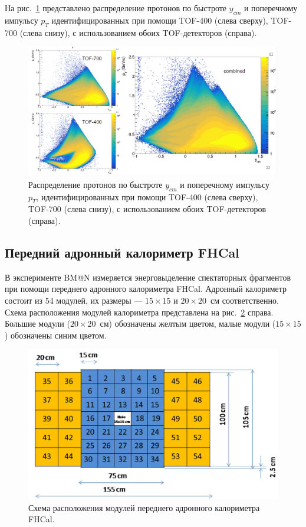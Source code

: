 На рис.~\ref{fig:bmn_pt_y} представлено распределение протонов по быстроте $y_{cm}$ и поперечному импульсу $p_T$ идентифицированных при помощи TOF-400 (слева сверху), TOF-700 (слева снизу), с использованием обоих TOF-детекторов (справа).
%
\begin{figure}[ht]
\begin{center}
\includegraphics[width=0.95\linewidth]{images/bmn_pt_y_acceptance.png}
\caption{Распределение протонов по быстроте $y_{cm}$ и поперечному импульсу $p_T$, идентифицированных при помощи TOF-400 (слева сверху), TOF-700 (слева снизу), с использованием обоих TOF-детекторов (справа).}
\label{fig:bmn_pt_y}
\end{center}
\end{figure}

\subsection{Передний адронный калориметр FHCal}

В эксперименте BM@N измеряется энерговыделение спектаторных фрагментов при помощи переднего адронного калориметра FHCal.
Адронный калориметр состоит из 54 модулей, их размеры --- $15\times15$ и $20\times20$~см соответственно.
Схема расположения модулей калориметра представлена на рис.~\ref{fig:fhcal_layout} справа.
Большие модули ($20\times20$~см) обозначены желтым цветом, малые модули ($15\times15$) обозначены синим цветом. 
%
\begin{figure}[ht]
\begin{center}
\includegraphics[width=0.95\linewidth]{images/FHCal_modules.png}
\caption{Схема расположения модулей переднего адронного калориметра FHCal.}
\label{fig:fhcal_layout}
\end{center}
\end{figure}

